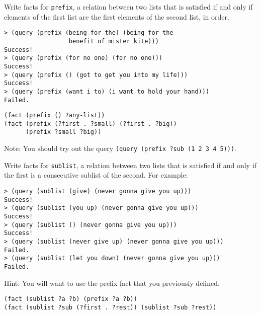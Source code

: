 \begin{blocksection}

\question Write facts for {\tt prefix}, a relation between two lists that is
satisfied if and only if elements of the first list are the first elements of
the second list, in order.

\begin{lstlisting}
> (query (prefix (being for the) (being for the
                  benefit of mister kite)))
Success!
> (query (prefix (for no one) (for no one)))
Success!
> (query (prefix () (got to get you into my life)))
Success!
> (query (prefix (want i to) (i want to hold your hand)))
Failed.
\end{lstlisting}

\begin{solution}[1.7in]
\begin{lstlisting}
(fact (prefix () ?any-list))
(fact (prefix (?first . ?small) (?first . ?big))
      (prefix ?small ?big))
\end{lstlisting}

Note: You should try out the query 
\texttt{(query (prefix ?sub (1 2 3 4 5)))}.
\end{solution}

\end{blocksection}

\begin{blocksection}

\question Write facts for {\tt sublist}, a relation between two lists that is
satisfied if and only if the first is a consecutive sublist of the second. For
example:

\begin{lstlisting}
> (query (sublist (give) (never gonna give you up)))
Success!
> (query (sublist (you up) (never gonna give you up)))
Success!
> (query (sublist () (never gonna give you up)))
Success!
> (query (sublist (never give up) (never gonna give you up)))
Failed.
> (query (sublist (let you down) (never gonna give you up)))
Failed.
\end{lstlisting}

Hint: You will want to use the prefix fact that you previously defined.

\begin{solution}[2in]
\begin{lstlisting}
(fact (sublist ?a ?b) (prefix ?a ?b))
(fact (sublist ?sub (?first . ?rest)) (sublist ?sub ?rest))
\end{lstlisting}
\end{solution}

\end{blocksection}
